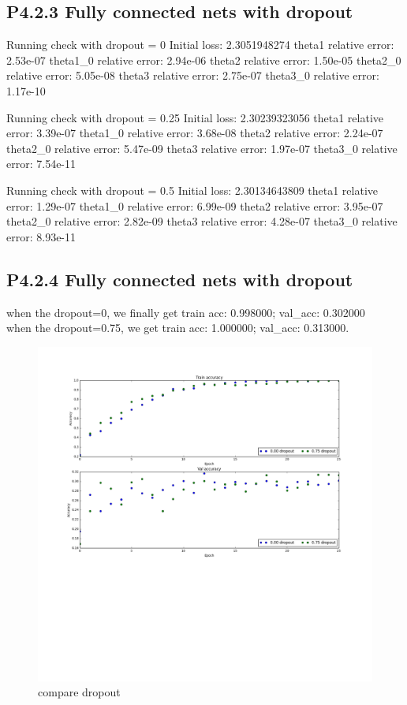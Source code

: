 \documentclass[12pt]{article}
\begin{document}
\subsection*{P4.2.3 Fully connected nets with dropout}




Running check with dropout =  0
Initial loss:  2.3051948274
theta1 relative error: 2.53e-07
theta1\_0 relative error: 2.94e-06
theta2 relative error: 1.50e-05
theta2\_0 relative error: 5.05e-08
theta3 relative error: 2.75e-07
theta3\_0 relative error: 1.17e-10

Running check with dropout =  0.25
Initial loss:  2.30239323056
theta1 relative error: 3.39e-07
theta1\_0 relative error: 3.68e-08
theta2 relative error: 2.24e-07
theta2\_0 relative error: 5.47e-09
theta3 relative error: 1.97e-07
theta3\_0 relative error: 7.54e-11

Running check with dropout =  0.5
Initial loss:  2.30134643809
theta1 relative error: 1.29e-07
theta1\_0 relative error: 6.99e-09
theta2 relative error: 3.95e-07
theta2\_0 relative error: 2.82e-09
theta3 relative error: 4.28e-07
theta3\_0 relative error: 8.93e-11




\subsection*{P4.2.4 Fully connected nets with dropout}

when the dropout=0, we finally get train acc: 0.998000; val\_acc: 0.302000\\
when the dropout=0.75, we get train acc: 1.000000; val\_acc: 0.313000.
\begin{figure}[H]
  \caption{compare dropout}
  \centering
    \includegraphics[scale=0.5]{dropout.png}
\end{figure}
\end{document}
